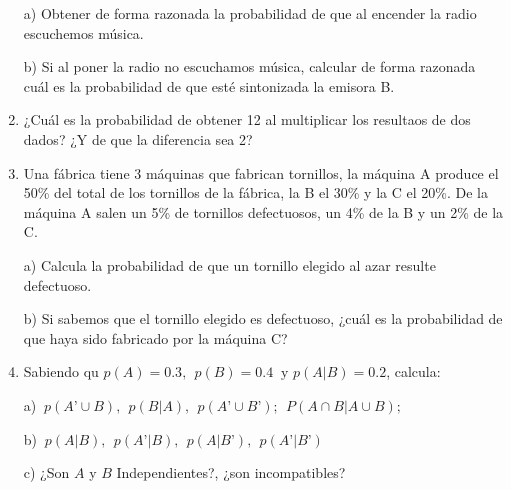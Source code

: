 \begin{adjustwidth}{5mm}{5mm}
\begin{enumerate}[PB. 1. ]
a) Obtener de forma razonada la probabilidad de que al encender la radio escuchemos música. 

b) Si al poner la radio no escuchamos música, calcular de forma razonada cuál es la probabilidad de que esté sintonizada la emisora B. 

\hspace{-1cm}\vspace{1cm}

\item  ¿Cuál es la probabilidad de obtener 12 al multiplicar los resultaos de dos dados? ¿Y de que la diferencia sea 2?

\hspace{-1cm}\vspace{1cm}


\item  Una fábrica tiene 3 máquinas que fabrican tornillos, la máquina A produce el 50\% del total de los tornillos de la fábrica, la B el 30\% y la C el 20\%. De la máquina A salen un 5\% de tornillos defectuosos, un 4\% de la B y un 2\% de la C. 

a) Calcula la probabilidad de que un tornillo elegido al azar resulte defectuoso.

b) Si sabemos que el tornillo elegido es defectuoso, ¿cuál es la probabilidad de que haya sido fabricado por la máquina C?

\hspace{-1cm}\vspace{1cm}

\item  Sabiendo qu $p(A)=0.3,\ \ p(B)=0.4 \ \text{ y } p(A|B)=0.2$, calcula:

a) $\ p(A’\cup B),\ \ p(B|A),\ \ p(A’\cup B’);\ \ P(A\cap B|A\cup B); $

b) $\ p(A|B),\ \  p(A’|B), \ \  p(A|B’), \ \  p(A’|B’)$

c) ¿Son $A$ y $B$ Independientes?, ¿son incompatibles?
 
\hspace{-1cm}

\hspace{-1cm}


\end{enumerate}
\end{adjustwidth}
